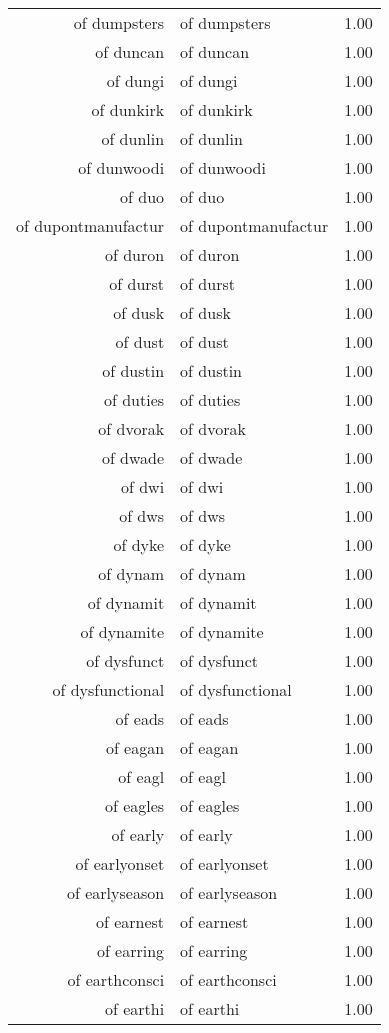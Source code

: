 \begin{table}[ht]
\begin{tabular}{rlr}
  of dumpsters & of dumpsters & 1.00 \\ 
  of duncan & of duncan & 1.00 \\ 
  of dungi & of dungi & 1.00 \\ 
  of dunkirk & of dunkirk & 1.00 \\ 
  of dunlin & of dunlin & 1.00 \\ 
  of dunwoodi & of dunwoodi & 1.00 \\ 
  of duo & of duo & 1.00 \\ 
  of dupontmanufactur & of dupontmanufactur & 1.00 \\ 
  of duron & of duron & 1.00 \\ 
  of durst & of durst & 1.00 \\ 
  of dusk & of dusk & 1.00 \\ 
  of dust & of dust & 1.00 \\ 
  of dustin & of dustin & 1.00 \\ 
  of duties & of duties & 1.00 \\ 
  of dvorak & of dvorak & 1.00 \\ 
  of dwade & of dwade & 1.00 \\ 
  of dwi & of dwi & 1.00 \\ 
  of dws & of dws & 1.00 \\ 
  of dyke & of dyke & 1.00 \\ 
  of dynam & of dynam & 1.00 \\ 
  of dynamit & of dynamit & 1.00 \\ 
  of dynamite & of dynamite & 1.00 \\ 
  of dysfunct & of dysfunct & 1.00 \\ 
  of dysfunctional & of dysfunctional & 1.00 \\ 
  of eads & of eads & 1.00 \\ 
  of eagan & of eagan & 1.00 \\ 
  of eagl & of eagl & 1.00 \\ 
  of eagles & of eagles & 1.00 \\ 
  of early & of early & 1.00 \\ 
  of earlyonset & of earlyonset & 1.00 \\ 
  of earlyseason & of earlyseason & 1.00 \\ 
  of earnest & of earnest & 1.00 \\ 
  of earring & of earring & 1.00 \\ 
  of earthconsci & of earthconsci & 1.00 \\ 
  of earthi & of earthi & 1.00 \\ 

\end{tabular}
\end{table}
